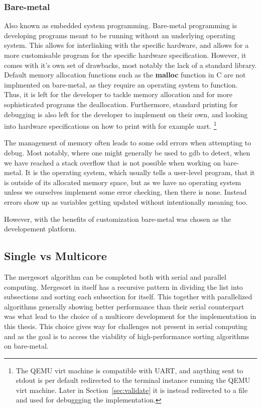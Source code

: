 \subsubsection{Bare-metal}\label{sec:bare-metal}
Also known as embedded system programming. Bare-metal programming is developing
programs meant to be running without an underlying operating system. This allows
for interlinking with the specific hardware, and allows for a more customisable
program for the specific hardware specification. However, it comes with it's own
set of drawbacks, most notably the lack of a standard library. Default memory
allocation functions such as the \textbf{malloc} function in C are not
implmented on bare-metal, as they require an operating system to function. Thus,
it is left for the developer to tackle memory allocation and for more
sophisticated programs the deallocation. Furthermore, standard printing for
debugging is also left for the developer to implement on their own, and looking
into hardware specifications on how to print with for example uart. \cite{uart}
\footnote{The QEMU virt machine is compatible with UART, and anything sent to
  stdout is per default redirected to the terminal instance running the QEMU
  virt machine. Later in Section~\ref{sec:validate} it is instead redirected to
  a file and used for debuggging the implementation.}

The management of memory often leads to some odd errors when attempting to
debug. Most notably, where one might generally be used to gdb to detect, when we
have reached a stack overflow that is not possible when working on bare-metal.
It is the operating system, which usually tells a user-level program, that it is
outside of its allocated memory space, but as we have no operating system
unless we ourselves implement some error checking, then there is none. Instead
errors show up as variables getting updated without intentionally meaning too.

However, with the benefits of customization bare-metal was chosen as the
developement platform.


\subsection{Single vs Multicore}\label{sec:singlevsmulti}
The mergesort algorithm can be completed both with serial and parallel
computing. Mergesort in itself has a recursive pattern in dividing the list into
subsections and sorting each subsection for itself. This together with
parallelized algorithms generally showing better performance than their serial
counterpart was what lead to the choice of a multicore development for the
implementation in this thesis. \cite{comp_parallel} This choice gives way for
challenges not present in serial computing and as the goal is to access the
viability of high-performance sorting algorithms on bare-metal.


